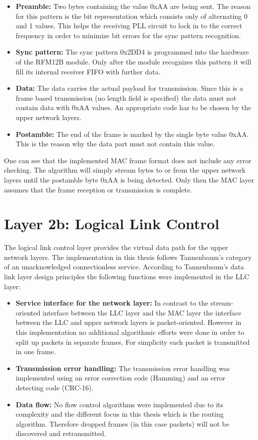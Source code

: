 \begin{itemize}
\item \textbf{Preamble:} Two bytes containing the value 0xAA are being sent. The reason for this pattern is the bit representation which consists only of alternating 0 and 1 values. This helps the receiving PLL circuit to lock in to the correct frequency in order to minimize bit errors for the sync pattern recognition.
\item \textbf{Sync pattern:} The sync pattern 0x2DD4 is programmed into the hardware of the RFM12B module. Only after the module recognizes this pattern it will fill its internal receiver FIFO with further data.
\item \textbf{Data:} The data carries the actual payload for transmission. Since this is a frame based transmission (no length field is specified) the data must not contain data with 0xAA values. An appropriate code has to be chosen by the upper network layers.
\item \textbf{Postamble:} The end of the frame is marked by the single byte value 0xAA. This is the reason why the data part must not contain this value.
\end{itemize}

One can see that the implemented MAC frame format does not include any error checking. The algorithm will simply stream bytes to or from the upper network layers until the postamble byte 0xAA is being detected. Only then the MAC layer assumes that the frame reception or transmission is complete.

\section{Layer 2b: Logical Link Control}
The logical link control layer provides the virtual data path for the upper network layers. The implementation in this thesis follows Tannenbaum's \cite{tannenbaum} category of an unacknowledged connectionless service. According to Tannenbaum's data link layer design principles the following functions were implemented in the LLC layer:

\begin{itemize}
\item \textbf{Service interface for the network layer:} In contrast to the stream-oriented interface between the LLC layer and the MAC layer the interface between the LLC and upper network layers is packet-oriented. However in this implementation no additional algorithmic efforts were done in order to split up packets in separate frames. For simplicity each packet is transmitted in one frame.
\item \textbf{Transmission error handling:} The transmission error handling was implemented using an error correction code (Hamming) and an error detecting code (CRC-16).
\item \textbf{Data flow:} No flow control algorithms were implemented due to its complexity and the different focus in this thesis which is the routing algorithm. Therefore dropped frames (in this case packets) will not be discovered and retransmitted.
\end{itemize}

